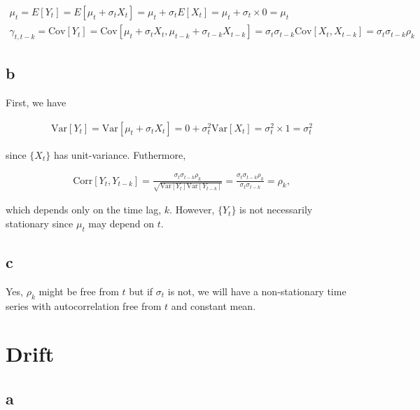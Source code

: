\documentclass[]{book}
\begin{document}
\begin{gather*}
  \mu_t = E[Y_t] = E[\mu_t + \sigma_t X_t] = \mu_t + \sigma_t E[X_t] = \mu_t + \sigma_t \times 0 = \mu_t\\
  \gamma_{t,t-k} = \text{Cov}[Y_t] = \text{Cov}[\mu_t + \sigma_t X_t, \mu_{t-k} + \sigma_{t-k} X_{t-k}] = 
    \sigma_t \sigma_{t-k} \text{Cov}[X_t, X_{t-k}] = \sigma_t \sigma_{t-k} \rho_k
\end{gather*}

\subsection*{b}\label{b-7}

First, we have

\begin{gather*}
  \text{Var}[Y_t] = \text{Var}[\mu_t + \sigma_t X_t] = 0 + \sigma_t^2 \text{Var}[X_t] = \sigma_t^2 \times 1 = \sigma_t^2
\end{gather*}

since \(\{X_t\}\) has unit-variance. Futhermore,

\begin{gather*}
  \text{Corr}[Y_t, Y_{t-k}] = \frac{\sigma_t \sigma_{t-k} \rho_k}{\sqrt{\text{Var}[Y_t]\text{Var}[Y_{t-k}]}} = 
    \frac{\sigma_t \sigma_{t-k}\rho_k}{\sigma_t \sigma_{t-k}} = \rho_k,
\end{gather*}

which depends only on the time lag, \(k\). However, \(\{Y_t\}\) is not
necessarily stationary since \(\mu_t\) may depend on \(t\).

\subsection*{c}\label{c-3}

Yes, \(\rho_k\) might be free from \(t\) but if \(\sigma_t\) is not, we
will have a non-stationary time series with autocorrelation free from
\(t\) and constant mean.

\section{Drift}\label{drift}

\subsection*{a}\label{a-8}
\end{document}
